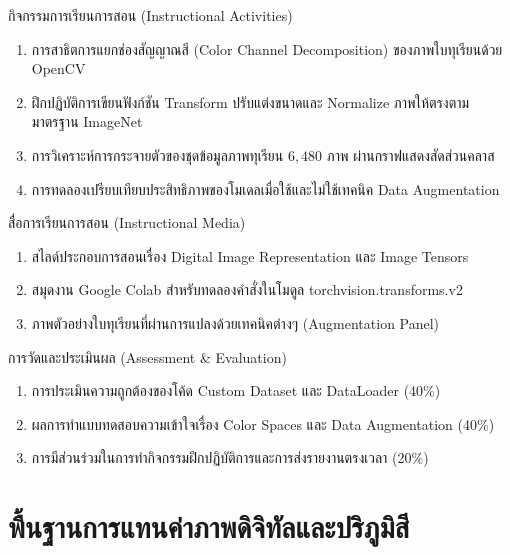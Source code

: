 \begin{planbox}{กิจกรรมการเรียนการสอน (Instructional Activities)}
\begin{enumerate}[leftmargin=1.5em, itemsep=2pt]
    \item การสาธิตการแยกช่องสัญญาณสี (Color Channel Decomposition) ของภาพใบทุเรียนด้วย OpenCV
    \item ฝึกปฏิบัติการเขียนฟังก์ชัน Transform ปรับแต่งขนาดและ Normalize ภาพให้ตรงตามมาตรฐาน ImageNet
    \item การวิเคราะห์การกระจายตัวของชุดข้อมูลภาพทุเรียน $6,480$ ภาพ ผ่านกราฟแสดงสัดส่วนคลาส
    \item การทดลองเปรียบเทียบประสิทธิภาพของโมเดลเมื่อใช้และไม่ใช้เทคนิค Data Augmentation
\end{enumerate}
\end{planbox}

\begin{planbox}{สื่อการเรียนการสอน (Instructional Media)}
\begin{enumerate}[leftmargin=1.5em, itemsep=2pt]
    \item สไลด์ประกอบการสอนเรื่อง Digital Image Representation และ Image Tensors
    \item สมุดงาน Google Colab สำหรับทดลองคำสั่งในโมดูล torchvision.transforms.v2
    \item ภาพตัวอย่างใบทุเรียนที่ผ่านการแปลงด้วยเทคนิคต่างๆ (Augmentation Panel)
\end{enumerate}
\end{planbox}

\begin{planbox}{การวัดและประเมินผล (Assessment \& Evaluation)}
\begin{enumerate}[leftmargin=1.5em, itemsep=2pt]
    \item การประเมินความถูกต้องของโค้ด Custom Dataset และ DataLoader (40\%)
    \item ผลการทำแบบทดสอบความเข้าใจเรื่อง Color Spaces และ Data Augmentation (40\%)
    \item การมีส่วนร่วมในการทำกิจกรรมฝึกปฏิบัติการและการส่งรายงานตรงเวลา (20\%)
\end{enumerate}
\end{planbox}

\clearpage

\section{พื้นฐานการแทนค่าภาพดิจิทัลและปริภูมิสี}

